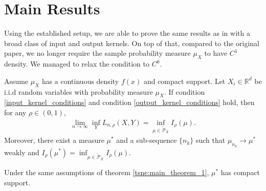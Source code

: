 \section{Main Results} \label{tsne:sec:main_results}
Using the established setup, we are able to prove the same results as in
\cite{auffinger-tsne} with a broad class of input and output kernels. On top of
that, compared to the original paper, we no longer require the sample
probability measure $\mu_X$ to have $C^1$ density. We managed to relax the
condition to $C^0$.
\begin{theorem} \label{tsne:main_theorem_1}
    Assume $\mu_X$ has a continuous density $f(x)$ and compact support. Let $X_i \in \mathbb{R}^d$ be i.i.d random variables with probability measure $\mu_X$. If condition \ref{input_kernel_conditions} and condition \ref{output_kernel_conditions} hold, then for any $\rho \in (0,1)$,
    \begin{align}
        \lim_{n \to \infty} \inf_Y L_{n,\rho}(X,Y) = \inf_{\mu \in \tilde{\mathcal{P}}_X} I_{\rho}(\mu).
    \end{align}
    Moreover, there exist a measure $\mu^*$ and a sub-sequence $\{n_k\}$ such that $\mu_{n_k} \to \mu^*$ weakly and $I_{\rho}(\mu^*) = \inf_{\mu \in \tilde{\mathcal{P}}_X} I_{\rho}(\mu)$.
\end{theorem}
\begin{theorem} \label{tsne:main_theorem_2}
    Under the same assumptions of theorem \ref{tsne:main_theorem_1}, $\mu^*$ has compact support.
\end{theorem}
